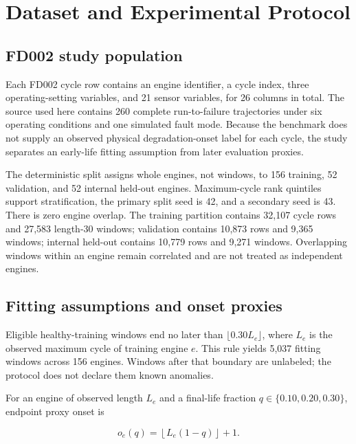 \documentclass[11pt]{article}
\begin{document}



\section{Dataset and Experimental Protocol}


\subsection{FD002 study population}


Each FD002 cycle row contains an engine identifier, a cycle index, three operating-setting variables, and 21 sensor variables, for 26 columns in total. The source used here contains 260 complete run-to-failure trajectories under six operating conditions and one simulated fault mode. Because the benchmark does not supply an observed physical degradation-onset label for each cycle, the study separates an early-life fitting assumption from later evaluation proxies.


The deterministic split assigns whole engines, not windows, to 156 training, 52 validation, and 52 internal held-out engines. Maximum-cycle rank quintiles support stratification, the primary split seed is 42, and a secondary seed is 43. There is zero engine overlap. The training partition contains 32,107 cycle rows and 27,583 length-30 windows; validation contains 10,873 rows and 9,365 windows; internal held-out contains 10,779 rows and 9,271 windows. Overlapping windows within an engine remain correlated and are not treated as independent engines.





\subsection{Fitting assumptions and onset proxies}


Eligible healthy-training windows end no later than $\lfloor0.30L_e\rfloor$, where $L_e$ is the observed maximum cycle of training engine $e$. This rule yields 5,037 fitting windows across 156 engines. Windows after that boundary are unlabeled; the protocol does not declare them known anomalies.


For an engine of observed length $L_e$ and a final-life fraction $q\in\{0.10,0.20,0.30\}$, endpoint proxy onset is


\[

o_e(q)=\left\lfloor L_e(1-q)\right\rfloor+1.
\]
\end{document}
